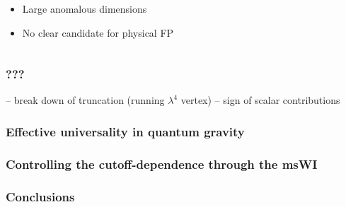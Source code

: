 \documentclass[]{beamer}  %
\begin{document}
\begin{frame}
\begin{enumerate}
\begin{columns}[T]
        \hspace{-20pt}
        \begin{column}{.5\textwidth}
          \begin{center}
            \begin{itemize}
            \item
              Large anomalous dimensions
            \item
              No clear candidate for physical FP
          \end{itemize}
          \end{center}
        \end{column}
      \end{columns}


  \end{enumerate}

\end{frame}



\begin{frame}
  \frametitle{???}

  -- break down of truncation (running $\lambda^4$ vertex)
  -- sign of scalar contributions

\end{frame}



\begin{frame}
  \frametitle{Effective universality in quantum gravity}

\end{frame}



\begin{frame}
  \frametitle{Controlling the cutoff-dependence through the msWI}

\end{frame}



\begin{frame}
  \frametitle{Conclusions}
\end{frame}


\begin{frame}
  \titlepage
\end{frame}
\end{document}
